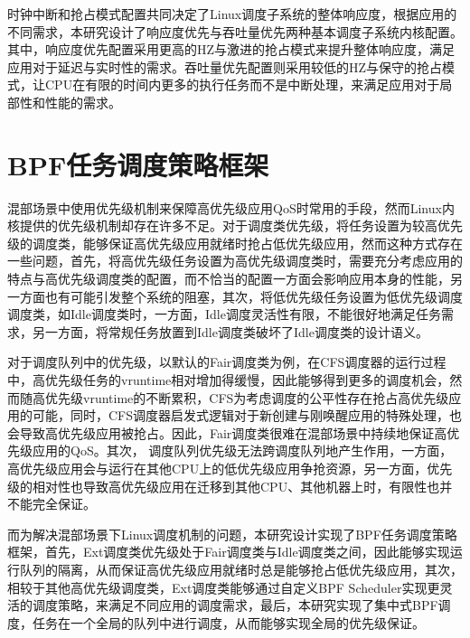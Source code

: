 时钟中断和抢占模式配置共同决定了Linux调度子系统的整体响应度，根据应用的不同需求，本研究设计了响应度优先与吞吐量优先两种基本调度子系统内核配置。其中，响应度优先配置采用更高的HZ与激进的抢占模式来提升整体响应度，满足应用对于延迟与实时性的需求。吞吐量优先配置则采用较低的HZ与保守的抢占模式，让CPU在有限的时间内更多的执行任务而不是中断处理，来满足应用对于局部性和性能的需求。

\section{BPF任务调度策略框架}


混部场景中使用优先级机制来保障高优先级应用QoS时常用的手段，然而Linux内核提供的优先级机制却存在许多不足。对于调度类优先级，将任务设置为较高优先级的调度类，能够保证高优先级应用就绪时抢占低优先级应用，然而这种方式存在一些问题，首先，将高优先级任务设置为高优先级调度类时，需要充分考虑应用的特点与高优先级调度类的配置，而不恰当的配置一方面会影响应用本身的性能，另一方面也有可能引发整个系统的阻塞，其次，将低优先级任务设置为低优先级调度调度类，如Idle调度类时，一方面，Idle调度灵活性有限，不能很好地满足任务需求，另一方面，将常规任务放置到Idle调度类破坏了Idle调度类的设计语义。

对于调度队列中的优先级，以默认的Fair调度类为例，在CFS调度器的运行过程中，高优先级任务的vruntime相对增加得缓慢，因此能够得到更多的调度机会，然而随高优先级vruntime的不断累积，CFS为考虑调度的公平性存在抢占高优先级应用的可能，同时，CFS调度器启发式逻辑对于新创建与刚唤醒应用的特殊处理，也会导致高优先级应用被抢占。因此，Fair调度类很难在混部场景中持续地保证高优先级应用的QoS。其次， 调度队列优先级无法跨调度队列地产生作用，一方面，高优先级应用会与运行在其他CPU上的低优先级应用争抢资源，另一方面，优先级的相对性也导致高优先级应用在迁移到其他CPU、其他机器上时，有限性也并不能完全保证。

而为解决混部场景下Linux调度机制的问题，本研究设计实现了BPF任务调度策略框架，首先，Ext调度类优先级处于Fair调度类与Idle调度类之间，因此能够实现运行队列的隔离，从而保证高优先级应用就绪时总是能够抢占低优先级应用，其次，相较于其他高优先级调度类，Ext调度类能够通过自定义BPF Scheduler实现更灵活的调度策略，来满足不同应用的调度需求，最后，本研究实现了集中式BPF调度，任务在一个全局的队列中进行调度，从而能够实现全局的优先级保证。

